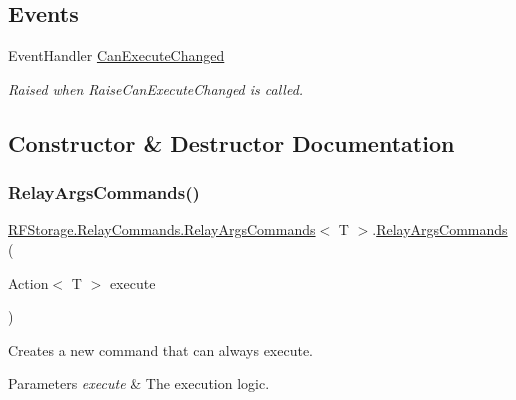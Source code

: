 \subsection*{Events}
\begin{DoxyCompactItemize}
\item 
Event\+Handler \mbox{\hyperlink{class_r_f_storage_1_1_relay_commands_1_1_relay_args_commands_a601b27519b427e6bc1d70dbb27e30554}{Can\+Execute\+Changed}}
\begin{DoxyCompactList}\small\item\em Raised when Raise\+Can\+Execute\+Changed is called. \end{DoxyCompactList}\end{DoxyCompactItemize}


\subsection{Constructor \& Destructor Documentation}
\mbox{\label{class_r_f_storage_1_1_relay_commands_1_1_relay_args_commands_a82cc465e0965b5add1e7601b15cca6f6}} 
\subsubsection{\texorpdfstring{RelayArgsCommands()}{RelayArgsCommands()}\hspace{0.1cm}{\footnotesize\ttfamily [1/2]}}
{\footnotesize\ttfamily \mbox{\hyperlink{class_r_f_storage_1_1_relay_commands_1_1_relay_args_commands}{R\+F\+Storage.\+Relay\+Commands.\+Relay\+Args\+Commands}}$<$ T $>$.\mbox{\hyperlink{class_r_f_storage_1_1_relay_commands_1_1_relay_args_commands}{Relay\+Args\+Commands}} (\begin{DoxyParamCaption}\item[{Action$<$ T $>$}]{execute }\end{DoxyParamCaption})}



Creates a new command that can always execute. 


\begin{DoxyParams}{Parameters}
{\em execute} & The execution logic.\\
\hline
\end{DoxyParams}
\mbox{\label{class_r_f_storage_1_1_relay_commands_1_1_relay_args_commands_a67d2f49983ad0072e54d86f827f228ba}} 
